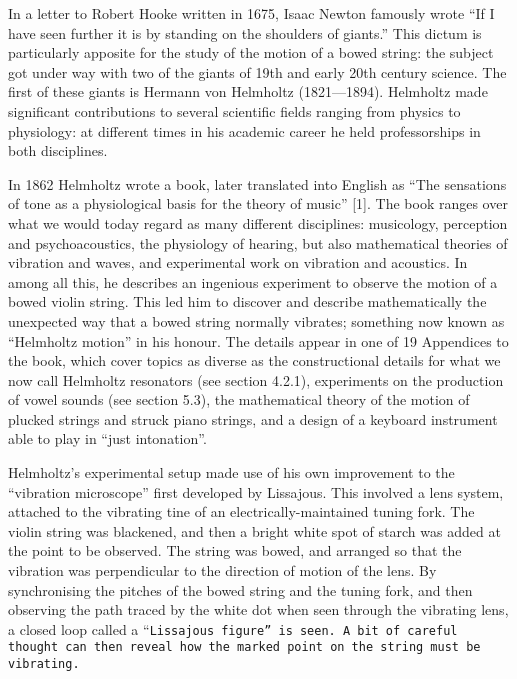   In a letter to Robert Hooke written in 1675, Isaac Newton famously wrote ``If 
  I have seen further it is by standing on the shoulders of giants.'' This 
  dictum is particularly apposite for the study of the motion of a bowed 
  string: the subject got under way with two of the giants of 19th and early 
  20th century science. The first of these giants is Hermann von Helmholtz 
  (1821—1894). Helmholtz made significant contributions to several scientific 
  fields ranging from physics to physiology: at different times in his academic 
  career he held professorships in both disciplines. 

  In 1862 Helmholtz wrote a book, later translated into English as “The 
  sensations of tone as a physiological basis for the theory of music” [1]. The 
  book ranges over what we would today regard as many different disciplines: 
  musicology, perception and psychoacoustics, the physiology of hearing, but 
  also mathematical theories of vibration and waves, and experimental work on 
  vibration and acoustics. In among all this, he describes an ingenious 
  experiment to observe the motion of a bowed violin string. This led him to 
  discover and describe mathematically the unexpected way that a bowed string 
  normally vibrates; something now known as “Helmholtz motion” in his honour. 
  The details appear in one of 19 Appendices to the book, which cover topics as 
  diverse as the constructional details for what we now call Helmholtz 
  resonators (see section 4.2.1), experiments on the production of vowel sounds 
  (see section 5.3), the mathematical theory of the motion of plucked strings 
  and struck piano strings, and a design of a keyboard instrument able to play 
  in “just intonation”. 

  Helmholtz’s experimental setup made use of his own improvement to the 
  “vibration microscope” first developed by Lissajous. This involved a lens 
  system, attached to the vibrating tine of an electrically-maintained tuning 
  fork. The violin string was blackened, and then a bright white spot of starch 
  was added at the point to be observed. The string was bowed, and arranged so 
  that the vibration was perpendicular to the direction of motion of the lens. 
  By synchronising the pitches of the bowed string and the tuning fork, and 
  then observing the path traced by the white dot when seen through the 
  vibrating lens, a closed loop called a “\tt{}Lissajous figure\rm{}” is seen. 
  A bit of careful thought can then reveal how the marked point on the string 
  must be vibrating. 

